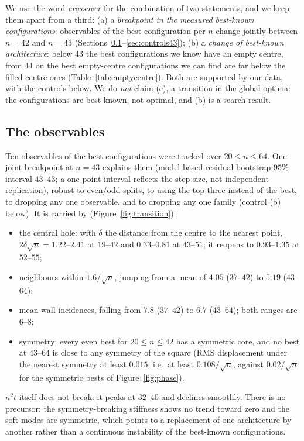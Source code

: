 \documentclass[11pt]{amsart}
\theoremstyle{definition}
\begin{document}
We use the word \emph{crossover} for the combination of two statements, and we keep them apart from a third:
(a) a \emph{breakpoint in the measured best-known configurations}: observables of the best configuration per $n$ change jointly between $n = 42$ and $n = 43$ (Sections~\ref{sec:obs43}--\ref{sec:controls43});
(b) a \emph{change of best-known architecture}: below $43$ the best configurations we know have an empty centre, from $44$ on the best empty-centre configurations we can find are far below the filled-centre ones (Table~\ref{tab:emptycentre}).
Both are supported by our data, with the controls below. We do \emph{not} claim (c), a transition in the global optima: the configurations are best known, not optimal, and (b) is a search result.

\subsection{The observables}\label{sec:obs43}
Ten observables of the best configurations were tracked over $20 \le n \le 64$. One joint breakpoint at $n = 43$ explains them (model-based residual bootstrap $95\%$ interval $43$--$43$; a one-point interval reflects the step size, not independent replication), robust to even/odd splits, to using the top three instead of the best, to dropping any one observable, and to dropping any one family (control (b) below). %
It is carried by (Figure~\ref{fig:transition}):
\begin{itemize}
\item the central hole: with $\delta$ the distance from the centre to the nearest point, $2\delta\sqrt n = 1.22$--$2.41$ at $19$--$42$ and $0.33$--$0.81$ at $43$--$51$; it reopens to $0.93$--$1.35$ at $52$--$55$;
\item neighbours within $1.6/\sqrt n$, jumping from a mean of $4.05$ ($37$--$42$) to $5.19$ ($43$--$64$);
\item mean wall incidences, falling from $7.8$ ($37$--$42$) to $6.7$ ($43$--$64$); both ranges are $6$--$8$;
\item symmetry: every even best for $20 \le n \le 42$ has a symmetric core, and no best at $43$--$64$ is close to any symmetry of the square (RMS displacement under the nearest symmetry at least $0.015$, i.e.\ at least $0.108/\sqrt n$, against $0.02/\sqrt n$ for the symmetric bests of Figure~\ref{fig:phase}).
\end{itemize}
$n^2t$ itself does not break: it peaks at $32$--$40$ and declines smoothly. There is no precursor: the symmetry-breaking stiffness shows no trend toward zero and the soft modes are symmetric, which points to a replacement of one architecture by another rather than a continuous instability of the best-known configurations. %
\end{document}
